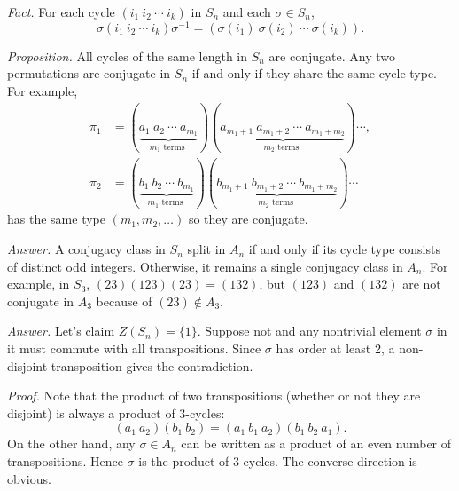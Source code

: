\documentclass{mathproblems}
\begin{document}
\begin{questions}

{\color{violet}
\textit{Fact.} For each cycle $(i_{1} \ i_{2} \ \cdots \ i_{k})$ in $S_{n}$ and each $\sigma \in S_{n}$,
$$
\sigma(i_{1} \ i_{2} \ \cdots \ i_{k}) \sigma^{-1}=(\sigma(i_{1}) \ \sigma(i_{2}) \ \cdots \ \sigma(i_{k})).
$$

\textit{Proposition.} All cycles of the same length in $S_n$ are conjugate. Any two permutations are conjugate in $S_n$ if and only if they share the same cycle type. For example,
$$
\begin{aligned}
\pi_{1}&=(\underbrace{a_{1}\ a_{2}\ \cdots \ a_{m_{1}}}_{m_{1} \text { terms }})(\underbrace{a_{m_{1}+1}\ a_{m_{1}+2}\ \cdots \ a_{m_{1}+m_{2}}}_{m_{2} \text { terms }}) \cdots,\\
\pi_{2}&=(\underbrace{b_{1}\ b_{2}\ \cdots\ b_{m_{1}}}_{m_{1} \text { terms }})(\underbrace{b_{m_{1}+1}\ b_{m_{1}+2}\ \cdots\ b_{m_{1}+m_{2}}}_{m_{2} \text { terms }}) \cdots
\end{aligned}
$$
has the same type $(m_1,m_2,\ldots)$ so they are conjugate.
}


\textit{Answer.} A conjugacy class in $S_n$ split in $A_n$ if and only if its cycle type consists of distinct odd integers. Otherwise, it remains a single conjugacy class in $A_n$. For example, in $S_3$, $(23)(123)(23)=(132)$, but $(123)$ and $(132)$ are not conjugate in $A_3$ because of $(23)\notin A_3$.


\textit{Answer.} Let's claim $Z(S_n)=\{1\}$. Suppose not and any nontrivial element $\sigma$ in it must commute with all transpositions. Since $\sigma$ has order at least 2, a non-disjoint transposition gives the contradiction.



\textit{Proof.} Note that the product of two transpositions (whether or not they are disjoint) is always a product of 3-cycles: 
$$
(a_{1} \ a_{2})(b_{1}\ b_{2})=(a_{1}\ b_{1}\ a_{2})(b_{1}\ b_{2}\ a_{1}).
$$
On the other hand, any $\sigma\in A_{n}$ can be written as a product of an even number of transpositions. Hence $\sigma$ is the product of 3-cycles. The converse direction is obvious.


\end{questions}
\end{document}
